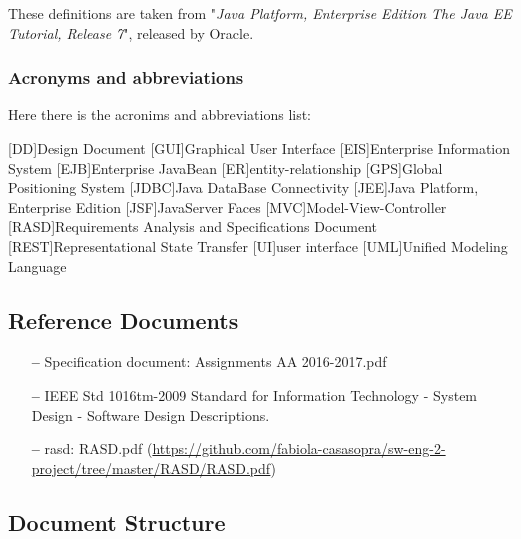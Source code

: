 These definitions are taken from "\textit{Java Platform, Enterprise Edition The Java EE Tutorial, Release 7}", released by Oracle.

\subsubsection{Acronyms and abbreviations } \label{acr}
Here there is the acronims and abbreviations list:

\begin{acronym}[DD] %

[DD]{Design Document}
[GUI]{Graphical User Interface}
[EIS]{Enterprise Information System}
[EJB]{Enterprise JavaBean}
[ER]{entity-relationship}
[GPS]{Global Positioning System}
[JDBC]{Java DataBase Connectivity}
[JEE]{Java Platform, Enterprise Edition}
[JSF]{JavaServer Faces}
[MVC]{Model-View-Controller}
[RASD]{Requirements Analysis and Specifications Document}
[REST]{Representational State Transfer}
[UI]{user interface}
[UML]{Unified Modeling Language}

\end{acronym}

\subsection{Reference Documents} \label{ref-doc}

\begin{itemize}
\item[\textbf{--}] Specification document: Assignments AA 2016-2017.pdf
\item[\textbf{--}] IEEE Std 1016tm-2009 Standard for Information Technology - System Design - Software Design Descriptions.
\item[\textbf{--}] \acl{rasd}: RASD.pdf 
\newline
(\url{https://github.com/fabiola-casasopra/sw-eng-2-project/tree/master/RASD/RASD.pdf})
\end{itemize}

\subsection{Document Structure} \label{doc-struct}

